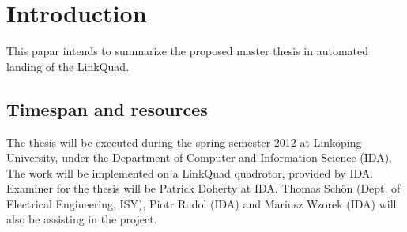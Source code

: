 \section{Introduction}
\label{sec:introduction}
    This papar intends to summarize the proposed master thesis in
    automated landing of the LinkQuad.

    \subsection{Timespan and resources}
        The thesis will be executed during the spring semester 2012 at
        Linköping University, under the Department of Computer and Information Science (IDA).
        The work will be implemented on a LinkQuad quadrotor, provided by IDA.
        Examiner for the thesis will be Patrick Doherty at IDA.
        Thomas Schön (Dept. of Electrical Engineering, ISY),
        Piotr Rudol (IDA) and Mariusz Wzorek (IDA) will also be assisting
        in the project.

